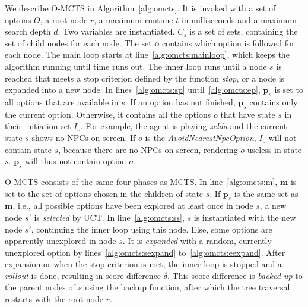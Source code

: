 We describe O-MCTS in Algorithm~\ref{alg:omcts}. It is invoked with a set of
options $O$, a root node $r$, a maximum runtime $t$ in milliseconds and a
maximum search depth $d$. Two variables are instantiated. $C_s$ is a set of
sets, containing the set of child nodes for each node. The set $\mathbf{o}$
contains which option is followed for each node. The main loop starts at 
line~\ref{alg:omcts:mainloop}, which keeps the algorithm running until time runs out.
The inner loop runs until a node $s$ is reached that meets a stop criterion
defined by the function \emph{stop}, or a node is expanded into a new node.
In lines~\ref{alg:omcts:sp} until~\ref{alg:omcts:ep}, $\mathbf{p}_s$ is set to
all options that are available in $s$. If an option has not finished,
$\mathbf{p}_s$ contains only the current option. Otherwise, it contains all the
options $o$ that have state $s$ in their initiation set $I_o$. For example, the
agent is playing \textit{zelda} and the current state $s$ shows no NPCs on
screen. If $o$ is the \textit{AvoidNearestNpcOption}, $I_o$ will not contain
state $s$, because there are no NPCs on screen, rendering $o$ useless in state
$s$. $\mathbf{p}_s$ will thus not contain option $o$.

O-MCTS consists of the same four phases as MCTS\@. In line~\ref{alg:omcts:m},
$\mathbf{m}$ is set to the set of options chosen in the children of state $s$.
If $\mathbf{p}_s$ is the same set as $\mathbf{m}$, i.e., all possible options
have been explored at least once in node $s$, a new node $s'$ is \emph{selected}
by UCT. In line~\ref{alg:omcts:ss}, $s$ is instantiated with the new
node $s'$, continuing the inner loop using this node.  Else, some options are
apparently unexplored in node $s$. It is \emph{expanded} with a random,
currently unexplored option by lines~\ref{alg:omcts:sexpand}
to~\ref{alg:omcts:eexpand}. After expansion or when the stop criterion is met,
the inner loop is stopped and a \emph{rollout} is done, resulting in score
difference $\delta$. This score difference is \emph{backed up} to the parent
nodes of $s$ using the backup function, after which the tree traversal restarts
with the root node $r$.

